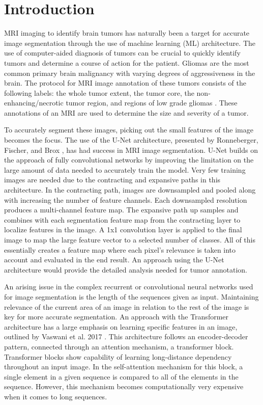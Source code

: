 \documentclass[conference]{IEEEtran}
\begin{document}
\section{Introduction}
MRI imaging to identify brain tumors has naturally been a target for accurate image segmentation through the use of machine learning (ML) architecture. The use of computer-aided diagnosis of tumors can be crucial to quickly identify tumors and determine a course of action for the patient. Gliomas are the most common primary brain malignancy with varying degrees of aggressiveness in the brain. The protocol for MRI image annotation of these tumors consists of the following labels: the whole tumor extent, the tumor core, the non-enhancing/necrotic tumor region, and regions of low grade gliomas \cite{bakas2019identifying}. These annotations of an MRI are used to determine the size and severity of a tumor.

To accurately segment these images, picking out the small features of the image becomes the focus. The use of the U-Net architecture, presented by Ronneberger, Fischer, and Brox \cite{ronneberger2015unet}, has had success in MRI image segmentation. U-Net builds on the approach of fully convolutional networks by improving the limitation on the large amount of data needed to accurately train the model. Very few training images are needed due to the contracting and expansive paths in this architecture. In the contracting path, images are downsampled and pooled along with increasing the number of feature channels. Each downsampled resolution produces a multi-channel feature map. The expansive path up samples and combines with each segmentation feature map from the contracting layer to localize features in the image. A 1x1 convolution layer is applied to the final image to map the large feature vector to a selected number of classes. All of this essentially creates a feature map where each pixel’s relevance is taken into account and evaluated in the end result. An approach using the U-Net architecture would provide the detailed analysis needed for tumor annotation.

An arising issue in the complex recurrent or convolutional neural networks used for image segmentation is the length of the sequences given as input. Maintaining relevance of the current area of an image in relation to the rest of the image is key for more accurate segmentation. An approach with the Transformer architecture has a large emphasis on learning specific features in an image, outlined by Vaswani et al. 2017 \cite{vaswani2023attention}. This architecture follows an encoder-decoder pattern, connected through an attention mechanism, a transformer block. Transformer blocks show capability of learning long-distance dependency throughout an input image. In the self-attention mechanism for this block, a single element in a given sequence is compared to all of the elements in the sequence. However, this mechanism becomes computationally very expensive when it comes to long sequences.
\end{document}
